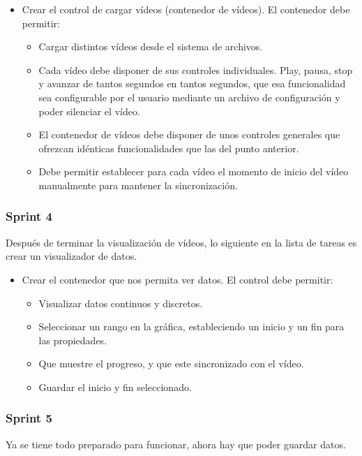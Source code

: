 \begin{itemize}
    \item Crear el control de cargar v\'{i}deos (contenedor de v\'{i}deos). El contenedor debe 
    permitir:
    \begin{itemize}
        \item Cargar distintos v\'{i}deos desde el sistema de archivos.
        \item Cada v\'{i}deo debe disponer de sus controles individuales. Play, pausa, stop y 
        avanzar de tantos segundos en tantos 
        segundos, que esa funcionalidad sea configurable por el usuario mediante un archivo
        de configuraci\'on y poder silenciar el v\'ideo.
        \item El contenedor de v\'{i}deos debe disponer de unos controles generales que ofrezcan 
        id\'enticas funcionalidades
        que las del punto anterior.
        \item Debe permitir establecer para cada v\'{i}deo el momento de inicio del v\'{i}deo 
        manualmente para mantener la 
        sincronizaci\'{o}n.
    \end{itemize}
\end{itemize}

\subsubsection{Sprint 4}
Despu\'{e}s de terminar la visualizaci\'{o}n de v\'{i}deos, lo siguiente en la lista de tareas es 
crear un visualizador de datos.

\begin{itemize}
    \item Crear el contenedor que nos permita ver datos. El control debe permitir:
    \begin{itemize}
        \item Visualizar datos continuos y discretos.
        \item Seleccionar un rango en la gr\'{a}fica, estableciendo un inicio y un fin para las 
        propiedades.
        \item Que muestre el progreso, y que este sincronizado con el v\'{i}deo.
        \item Guardar el inicio y fin seleccionado.
    \end{itemize}
\end{itemize}

\subsubsection{Sprint 5}
Ya se tiene todo preparado para funcionar, ahora hay que poder guardar datos.

